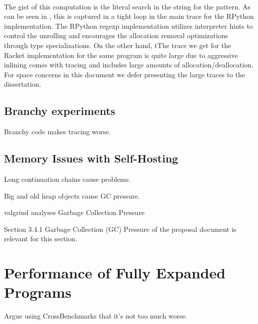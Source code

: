 			\paragraph{}%
			The gist of this computation is the literal search in the string for
			the  pattern. As can be seen in
			, this is captured in a tight loop in the
			main trace for the RPython implementation. The RPython regexp
			implementation utilizes interpreter hints to control the unrolling and
			encourages the allocation removal optimizations through type
			specializations. On the other hand, tThe trace we get for the Racket
			implementation for the same program is quite large due to aggressive
			inlining comes with tracing and includes large amounts of
			allocation/deallocation. For space concerns in this document we defer
			presenting the large traces to the dissertation.


		\subsection{Branchy experiments}
			\begin{mainpoint}
				Branchy code makes tracing worse.
			\end{mainpoint}
			\label{section:branchy}


		\subsection{Memory Issues with Self-Hosting}
		\label{subsection:memory}

			\begin{mainpoint}
				Long continuation chains cause problems.

				Big and old heap objects cause GC pressure.
			\end{mainpoint}

			valgrind analyses
			Garbage Collection Pressure

			\begin{todo}[Import]
				Section 3.4.1 Garbage Collection (GC) Pressure of the proposal document is relevant for this section.
			\end{todo}

	\section{Performance of Fully Expanded Programs}
	\label{section:cross-benchmarks}

		\begin{mainpoint}
				Argue using CrossBenchmarks that it's not too much worse.
		\end{mainpoint}

